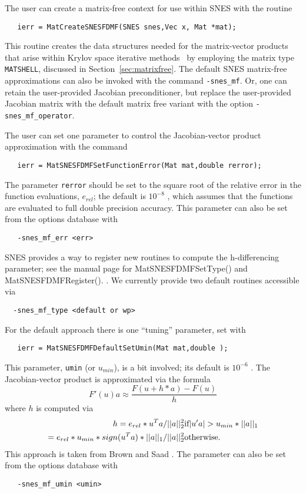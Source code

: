 The user can create a matrix-free context for use within SNES with 
the routine
\begin{verbatim}
   ierr = MatCreateSNESFDMF(SNES snes,Vec x, Mat *mat);
\end{verbatim}
This routine creates the data structures needed for the matrix-vector 
products that arise within Krylov space iterative methods~\cite{brownsaad:90}
by employing the matrix type {\tt MATSHELL}, 
discussed in Section~\ref{sec:matrixfree}.  The default SNES matrix-free
approximations can also be invoked with the command {\tt -snes\_mf}. 
Or, one can retain the user-provided Jacobian preconditioner, but replace the 
user-provided Jacobian matrix with the default matrix free variant with the
option {\tt -snes\_mf\_operator}. 

The user can set one parameter to control the Jacobian-vector
product approximation with the command
\begin{verbatim}
   ierr = MatSNESFDMFSetFunctionError(Mat mat,double rerror);
\end{verbatim}
The parameter {\tt rerror} should be set to the square root of the 
relative error in the function evaluations, $e_{rel}$; the default is $ 10^{-8} $ , 
which assumes that the functions are evaluated to full double precision accuracy. 
This parameter can also be set from the options database with 
\begin{verbatim}
   -snes_mf_err <err>
\end{verbatim}

SNES provides a way to register new routines to compute the h-differencing parameter;
see the manual page for MatSNESFDMFSetType() and MatSNESFDMFRegister(). 
. We currently provide two default routines accessible via
\begin{verbatim}
  -snes_mf_type <default or wp>
\end{verbatim}
For the default approach there is one ``tuning'' parameter, set with 
\begin{verbatim}
   ierr = MatSNESFDMFDefaultSetUmin(Mat mat,double );
\end{verbatim}
This parameter, {\tt umin} (or $u_{min}$), is a bit involved; its default is 
$ 10^{-6} $ . The Jacobian-vector product is approximated via the formula
\[
    F'(u) a \approx \frac{F(u + h*a) - F(u)}{h}
\]
where $ h $ is computed via 
\begin{eqnarray*}
        h = e_{rel}*u^{T}a/||a||^2_2                       &    \hbox{if}  |u'a| > u_{min}*||a||_{1} \\
          = e_{rel}*u_{min}*sign(u^{T}a)*||a||_{1}/||a||^2_2  &    \hbox{otherwise}.
\end{eqnarray*}
This approach is taken from Brown and Saad \cite{brownsaad:90}.
The parameter can also be set from the options database with 
\begin{verbatim}
   -snes_mf_umin <umin>
\end{verbatim}

